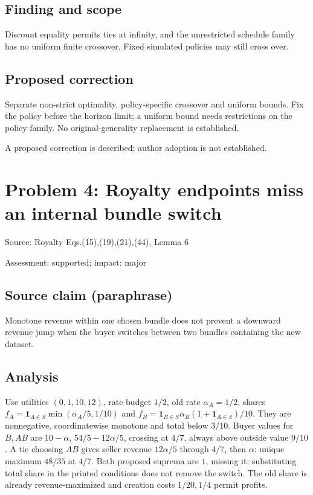 \documentclass[11pt]{article}
\begin{document}
\subsection*{Finding and scope}

Discount equality permits ties at infinity, and the unrestricted schedule family has no uniform finite crossover. Fixed simulated policies may still cross over.

\subsection*{Proposed correction}

Separate non-strict optimality, policy-specific crossover and uniform bounds. Fix the policy before the horizon limit; a uniform bound needs restrictions on the policy family. No original-generality replacement is established.

A proposed correction is described; author adoption is not established.

\section*{Problem 4: Royalty endpoints miss an internal bundle switch}

Source: Royalty Eqs.(15),(19),(21),(44), Lemma 6

Assessment: supported; impact: major

\subsection*{Source claim (paraphrase)}

Monotone revenue within one chosen bundle does not prevent a downward revenue jump when the buyer switches between two bundles containing the new dataset.

\subsection*{Analysis}

Use utilities \((0,1,10,12)\), rate budget \(1/2\), old rate \(\alpha_A=1/2\), shares \(f_A=\mathbf1_{A\in S}\min(\alpha_A/5,1/10)\) and \(f_B=\mathbf1_{B\in S}\alpha_B(1+\mathbf1_{A\in S})/10\). They are nonnegative, coordinatewise monotone and total below \(3/10\). Buyer values for \(B,AB\) are \(10-\alpha\), \(54/5-12\alpha/5\), crossing at \(4/7\), always above outside value \(9/10\). A tie choosing \(AB\) gives seller revenue \(12\alpha/5\) through \(4/7\), then \(\alpha\): unique maximum \(48/35\) at \(4/7\). Both proposed suprema are \(1\), missing it; substituting total share in the printed conditions does not remove the switch. The old share is already revenue-maximized and creation costs \(1/20,1/4\) permit profits.
\end{document}
